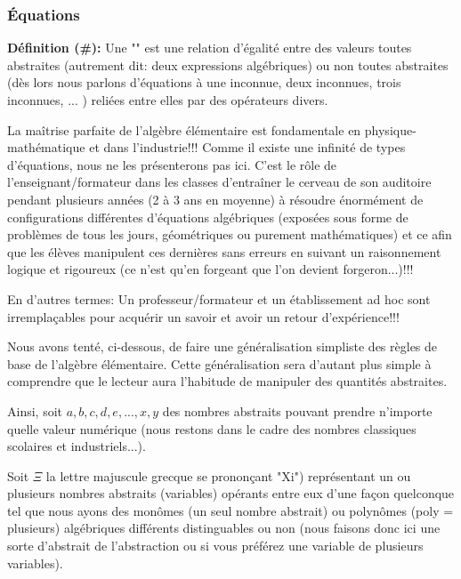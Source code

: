 	\subsubsection{Équations}
	\textbf{Définition (\#\mydef):} Une "" est une relation d'égalité entre des valeurs toutes abstraites (autrement dit: deux expressions algébriques) ou non toutes abstraites (dès lors nous parlons d'équations à une inconnue, deux inconnues, trois inconnues, ... ) reliées entre elles par des opérateurs divers.

	La maîtrise parfaite de l'algèbre élémentaire est fondamentale en physique-mathématique et dans l'industrie!!! Comme il existe une infinité de types d'équations, nous ne les présenterons pas ici. C'est le rôle de l'enseignant/formateur dans les classes d'entraîner le cerveau de son auditoire pendant plusieurs années (2 à 3 ans en moyenne) à résoudre énormément de configurations différentes d'équations algébriques (exposées sous forme de problèmes de tous les jours, géométriques ou purement mathématiques) et ce afin que les élèves manipulent ces dernières sans erreurs en suivant un raisonnement logique et rigoureux (ce n'est qu'en forgeant que l'on devient forgeron...)!!!

	En d'autres termes: Un professeur/formateur et un établissement ad hoc sont irremplaçables pour
acquérir un savoir et avoir un retour d'expérience!!!

	\begin{tcolorbox}[title=Remarque,colframe=black,arc=10pt]
Nous avons tenté, ci-dessous, de faire une généralisation simpliste des règles de base de l'algèbre élémentaire. Cette généralisation sera d'autant plus simple à comprendre que le lecteur aura l'habitude de manipuler des quantités abstraites.
	\end{tcolorbox}	

	Ainsi, soit $a, b, c, d, e, ..., x, y$ des nombres abstraits pouvant prendre n'importe quelle valeur numérique (nous restons dans le cadre des nombres classiques scolaires et industriels...).

	Soit $\Xi$ la lettre majuscule grecque se prononçant "Xi") représentant un ou plusieurs nombres abstraits (variables) opérants entre eux d'une façon quelconque tel que nous ayons des monômes (un seul nombre abstrait) ou polynômes (poly = plusieurs) algébriques différents distinguables ou non (nous faisons donc ici une sorte d'abstrait de l'abstraction ou si vous préférez une variable de plusieurs variables).

